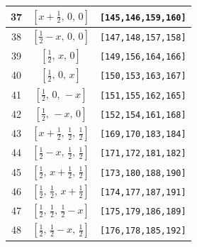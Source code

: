 \documentclass[fleqn,8pt]{jsarticle}
\begin{document}
\begin{longtable}{ccc}
37 & $\left[ x + \frac{1}{2},\, 0,\, 0 \right]$ & {\tt [145,146,159,160]} \\ \hline
38 & $\left[ \frac{1}{2} - x,\, 0,\, 0 \right]$ & {\tt [147,148,157,158]} \\ \hline
39 & $\left[ \frac{1}{2},\, x,\, 0 \right]$ & {\tt [149,156,164,166]} \\ \hline
40 & $\left[ \frac{1}{2},\, 0,\, x \right]$ & {\tt [150,153,163,167]} \\ \hline
41 & $\left[ \frac{1}{2},\, 0,\, - x \right]$ & {\tt [151,155,162,165]} \\ \hline
42 & $\left[ \frac{1}{2},\, - x,\, 0 \right]$ & {\tt [152,154,161,168]} \\ \hline
43 & $\left[ x + \frac{1}{2},\, \frac{1}{2},\, \frac{1}{2} \right]$ & {\tt [169,170,183,184]} \\ \hline
44 & $\left[ \frac{1}{2} - x,\, \frac{1}{2},\, \frac{1}{2} \right]$ & {\tt [171,172,181,182]} \\ \hline
45 & $\left[ \frac{1}{2},\, x + \frac{1}{2},\, \frac{1}{2} \right]$ & {\tt [173,180,188,190]} \\ \hline
46 & $\left[ \frac{1}{2},\, \frac{1}{2},\, x + \frac{1}{2} \right]$ & {\tt [174,177,187,191]} \\ \hline
47 & $\left[ \frac{1}{2},\, \frac{1}{2},\, \frac{1}{2} - x \right]$ & {\tt [175,179,186,189]} \\ \hline
48 & $\left[ \frac{1}{2},\, \frac{1}{2} - x,\, \frac{1}{2} \right]$ & {\tt [176,178,185,192]} \\
\end{longtable}
\renewcommand{\arraystretch}{1.2}
\end{document}
